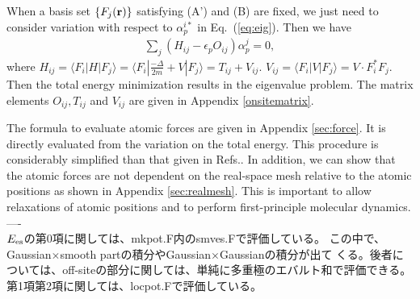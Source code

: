 \documentclass[a4paper,10pt,aip,onecolumn,amsmath,amssymb,floatfix,rmp]{revtex4-1}
\newcommand{\bfr}{{\bf r}}
\newcommand{\ooplus}{\oplus}
\newcommand{\oominus}{\ominus}
\newcommand{\req}[1]{\mbox{Eq.~\!(\ref{#1})}}
\begin{document}
When a basis set $\{F_j(\bfr)\}$ satisfying (A') and (B) are fixed, we
just need to consider variation with respect to $\alpha_{p}^{i*}$ in
\req{eq:eig}. Then we have
\begin{eqnarray}
\sum_j (H_{ij} -\epsilon_p O_{ij}) \alpha_p^j =0,
\label{eq:eigenp}
\end{eqnarray}
where $H_{ij}= \langle F_i| H |F_{j} \rangle = 
\langle F_i| \frac{-\Delta}{2m} + V |F_{j} \rangle =T_{ij}+V_{ij}$.
$V_{ij}=\langle F_i|V|F_{j} \rangle=V \cdot F^*_i F_j$. 
Then the total energy minimization results in the eigenvalue problem.
The matrix elements $O_{ij},T_{ij}$
and $V_{ij}$ are given in Appendix \ref{onsitematrix}.

The formula to evaluate atomic forces are given in Appendix
\ref{sec:force}. It is directly evaluated from the variation on the
total energy. This procedure is considerably simplified than that given
in Refs.\cite{lmfchap,molforce}. In addition, we can show that the
atomic forces are not dependent on the real-space mesh relative to the
atomic positions as shown in Appendix \ref{sec:realmesh}. This is
important to allow relaxations of atomic positions and to perform
first-principle molecular dynamics.\\

----\\
$E_{\rm es}$の第0項に関しては、mkpot.F内のsmves.Fで評価している。
この中で、Gaussian$\times$smooth partの積分やGaussian$\times$Gaussianの積分が出て
くる。後者については、off-siteの部分に関しては、単純に多重極のエバルト和で評価できる。
第1項第2項に関しては、locpot.Fで評価している。

\end{document}
